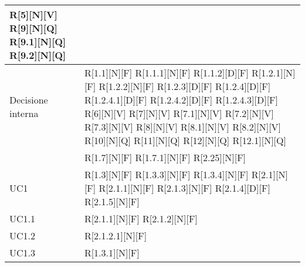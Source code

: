 \begin{longtable}{X | X}
R[5][N][V] \newline
R[9][N][Q] \newline
R[9.1][N][Q] \newline
R[9.2][N][Q]  \\
\hline
Decisione interna & R[1.1][N][F] \newline
R[1.1.1][N][F] \newline
R[1.1.2][D][F] \newline
R[1.2.1][N][F] \newline
R[1.2.2][N][F] \newline
R[1.2.3][D][F] \newline
R[1.2.4][D][F] \newline
R[1.2.4.1][D][F] \newline
R[1.2.4.2][D][F] \newline
R[1.2.4.3][D][F] \newline
R[6][N][V] \newline
R[7][N][V] \newline
R[7.1][N][V] \newline
R[7.2][N][V] \newline
R[7.3][N][V] \newline
R[8][N][V] \newline
R[8.1][N][V] \newline
R[8.2][N][V] \newline
R[10][N][Q] \newline
R[11][N][Q] \newline
R[12][N][Q]  \newline
R[12.1][N][Q]\\
\hline
 & R[1.7][N][F] \newline
R[1.7.1][N][F] \newline
R[2.25][N][F]  \\
\hline
UC1 & R[1.3][N][F] \newline
R[1.3.3][N][F] \newline
R[1.3.4][N][F] \newline
R[2.1][N][F] \newline
R[2.1.1][N][F] \newline
R[2.1.3][N][F] \newline
R[2.1.4][D][F] \newline
R[2.1.5][N][F]  \\
\hline
UC1.1 & R[2.1.1][N][F] \newline
R[2.1.2][N][F]  \\
\hline
UC1.2 & R[2.1.2.1][N][F]  \\
\hline
UC1.3 & R[1.3.1][N][F] \newline

\end{longtable}
